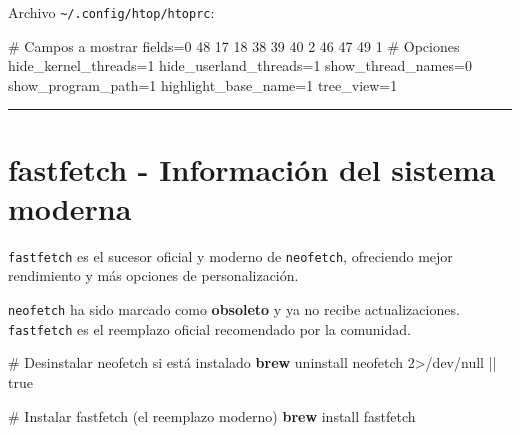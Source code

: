 \documentclass[
  11pt,
  letterpaper,
  oneside,
  openany]{scrbook}
\newenvironment{Shaded}{}{}
\newcommand{\CommentTok}[1]{\textcolor[rgb]{0.42,0.45,0.49}{#1}}
\newcommand{\DataTypeTok}[1]{\textcolor[rgb]{0.84,0.23,0.29}{#1}}
\newcommand{\DecValTok}[1]{\textcolor[rgb]{0.00,0.36,0.77}{#1}}
\newcommand{\ExtensionTok}[1]{\textcolor[rgb]{0.84,0.23,0.29}{\textbf{#1}}}
\newcommand{\FunctionTok}[1]{\textcolor[rgb]{0.44,0.26,0.76}{#1}}
\newcommand{\KeywordTok}[1]{\textcolor[rgb]{0.84,0.23,0.29}{#1}}
\newcommand{\NormalTok}[1]{\textcolor[rgb]{0.14,0.16,0.18}{#1}}
\newcommand{\OperatorTok}[1]{\textcolor[rgb]{0.14,0.16,0.18}{#1}}
\newcommand{\OtherTok}[1]{\textcolor[rgb]{0.44,0.26,0.76}{#1}}
\newcommand{\StringTok}[1]{\textcolor[rgb]{0.01,0.18,0.38}{#1}}
\begin{document}
Archivo \texttt{\textasciitilde{}/.config/htop/htoprc}:

\begin{Shaded}
\begin{Highlighting}[]
\CommentTok{\# Campos a mostrar}
\DataTypeTok{fields}\OtherTok{=}\StringTok{0 48 17 18 38 39 40 2 46 47 49 1}
\CommentTok{\# Opciones}
\DataTypeTok{hide\_kernel\_threads}\OtherTok{=}\DecValTok{1}
\DataTypeTok{hide\_userland\_threads}\OtherTok{=}\DecValTok{1}
\DataTypeTok{show\_thread\_names}\OtherTok{=}\DecValTok{0}
\DataTypeTok{show\_program\_path}\OtherTok{=}\DecValTok{1}
\DataTypeTok{highlight\_base\_name}\OtherTok{=}\DecValTok{1}
\DataTypeTok{tree\_view}\OtherTok{=}\DecValTok{1}
\end{Highlighting}
\end{Shaded}

\begin{center}\rule{0.5\linewidth}{0.5pt}\end{center}

\section{fastfetch - Información del sistema
moderna}\label{sec-fastfetch}

\texttt{fastfetch} es el sucesor oficial y moderno de \texttt{neofetch},
ofreciendo mejor rendimiento y más opciones de personalización.

\begin{tcolorbox}[enhanced jigsaw, coltitle=black, breakable, arc=.35mm, toprule=.15mm, colbacktitle=quarto-callout-warning-color!10!white, colframe=quarto-callout-warning-color-frame, opacityback=0, colback=white, bottomtitle=1mm, bottomrule=.15mm, rightrule=.15mm, left=2mm, toptitle=1mm, leftrule=.75mm, title=\textcolor{quarto-callout-warning-color}{\faExclamationTriangle}\hspace{0.5em}{⚠️ Migración desde neofetch}, titlerule=0mm, opacitybacktitle=0.6]

\texttt{neofetch} ha sido marcado como \textbf{obsoleto} y ya no recibe
actualizaciones. \texttt{fastfetch} es el reemplazo oficial recomendado
por la comunidad.

\begin{Shaded}
\begin{Highlighting}[]
\CommentTok{\# Desinstalar neofetch si está instalado}
\ExtensionTok{brew}\NormalTok{ uninstall neofetch }\DecValTok{2}\OperatorTok{\textgreater{}}\NormalTok{/dev/null }\KeywordTok{||} \FunctionTok{true}

\CommentTok{\# Instalar fastfetch (el reemplazo moderno)}
\ExtensionTok{brew}\NormalTok{ install fastfetch}
\end{Highlighting}
\end{Shaded}

\end{tcolorbox}
\end{document}
